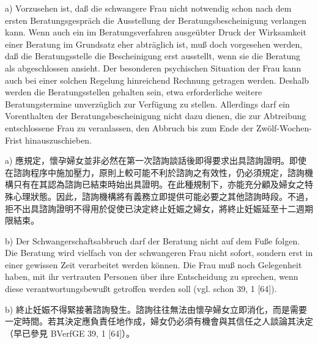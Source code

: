 \documentclass[12pt]{article}
\begin{document}
\begin{sourcepara}[title={原文D.121}]
a) Vorzusehen ist, daß die schwangere Frau nicht notwendig schon nach dem ersten Beratungsgespräch die Ausstellung der Beratungsbescheinigung verlangen kann. Wenn auch ein im Beratungsverfahren ausgeübter Druck der Wirksamkeit einer Beratung im Grundsatz eher abträglich ist, muß doch vorgesehen werden, daß die Beratungsstelle die Bescheinigung erst ausstellt, wenn sie die Beratung als abgeschlossen ansieht. Der besonderen psychischen Situation der Frau kann auch bei einer solchen Regelung hinreichend Rechnung getragen werden. Deshalb werden die Beratungsstellen gehalten sein, etwa erforderliche weitere Beratungstermine unverzüglich zur Verfügung zu stellen. Allerdings darf ein Vorenthalten der Beratungsbescheinigung nicht dazu dienen, die zur Abtreibung entschlossene Frau zu veranlassen, den Abbruch bis zum Ende der Zwölf-Wochen-Frist hinauszuschieben.
\end{sourcepara}
\begin{transpara}
a) 應規定，懷孕婦女並非必然在第一次諮詢談話後即得要求出具諮詢證明。即使在諮詢程序中施加壓力，原則上較可能不利於諮詢之有效性，仍必須規定，諮詢機構只有在其認為諮詢已結束時始出具證明。在此種規制下，亦能充分顧及婦女之特殊心理狀態。因此，諮詢機構將有義務立即提供可能必要之其他諮詢時段。不過，拒不出具諮詢證明不得用於促使已決定終止妊娠之婦女，將終止妊娠延至十二週期限結束。
\end{transpara}

\begin{sourcepara}[title={原文D.122}]
b) Der Schwangerschaftsabbruch darf der Beratung nicht auf dem Fuße folgen. Die Beratung wird vielfach von der schwangeren Frau nicht sofort, sondern erst in einer gewissen Zeit verarbeitet werden können. Die Frau muß noch Gelegenheit haben, mit ihr vertrauten Personen über ihre Entscheidung zu sprechen, wenn diese verantwortungsbewußt getroffen werden soll (vgl. schon \abbrBVerfGE{} 39, 1 [64]).
\end{sourcepara}
\begin{transpara}
b) 終止妊娠不得緊接著諮詢發生。諮詢往往無法由懷孕婦女立即消化，而是需要一定時間。若其決定應負責任地作成，婦女仍必須有機會與其信任之人談論其決定（早已參見 BVerfGE 39, 1 [64]）。
\end{transpara}
\end{document}
